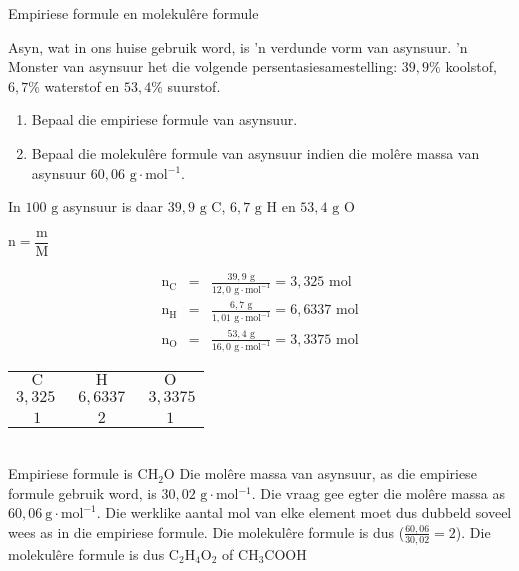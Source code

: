     \noindent
\label{m38712*secfhsst!!!underscore!!!id1308} 
      \noindent 
      \begin{wex}{Empiriese formule en molekul\^{e}re formule
      }
 {
Asyn, wat in ons huise gebruik word, is 'n verdunde vorm van asynsuur. 'n Monster van
      asynsuur het die volgende persentasiesamestelling: $39,9\%$ koolstof, $6,7\%$ waterstof en $53,4\%$ suurstof.  
\begin{enumerate}[noitemsep, label=\textbf{\arabic*}. ] 
\item Bepaal die empiriese formule van asynsuur.
\item Bepaal die molekulêre formule van asynsuur indien die mol\^{e}re massa van asynsuur $60,06 \text{ g} \cdot \text{mol}{}^{-1}$.
\end{enumerate}
     }
{
      \label{m38712*id281607}In $100 \text{ g}$ asynsuur is daar $39,9 \text{ g C}$, $6,7 \text{ g H}$ en $53,4\text{ g O}$ 

        $\text{n}=\dfrac{\text{m}}{\text{M}}$
      
      \label{m38712*id281653}\nopagebreak\noindent{}
        
    \begin{eqnarray*}
{\text{n}}_{\text{C}} & = & \frac{39,9 \text{ g}}{12,0 \text{ g} \cdot \text{mol}^{-1}} = 3,325 \text{ mol} \\
{\text{n}}_{\text{H}} & = & \frac{6,7 \text{ g}}{1,01 \text{ g} \cdot \text{mol}^{-1}} = 6,6337 \text{ mol} \\
{\text{n}}_{\text{O}} & = & \frac{53,4 \text{ g}}{16,0 \text{ g} \cdot \text{mol}^{-1}} = 3,3375 \text{ mol}
      \end{eqnarray*}
\begin{tabular}{c@{:}c@{:}c}
$\text{C}$ & $\text{H}$ & $\text{O}$\\
$3,325~$ & $~6,6337~$ & $~3,3375$ \\
$1$ & $2$ & $1$\\
\end{tabular}\\
Empiriese formule is $\text{CH}{}_{2}\text{O}$ 
      \label{m38712*id281834}Die mol\^{e}re massa van asynsuur, as die empiriese formule gebruik word, is $30,02 \text{ g} \cdot \text{mol}{}^{-1}$. Die vraag gee egter die mol\^{e}re massa as $60,06~\text{g}\cdot \text{mol}^{-1}$. Die werklike aantal mol van elke element moet dus dubbeld soveel wees as in die empiriese formule. Die molekul\^{e}re formule is dus  ($\frac{60,06}{30,02}=2$).
      \label{m38712*id281854}Die molekul\^ere formule is dus $\text{C}{}_{2}\text{H}{}_{4}\text{O}{}_{2}$ of $\text{CH}{}_{3}\text{COOH}$
}
    \end{wex}
